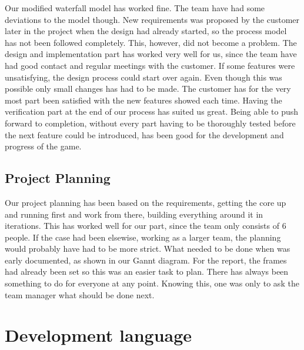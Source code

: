 Our modified waterfall model has worked fine. The team have had some deviations to the model though. New requirements was
proposed by the customer later in the project when the design had already started, so the process model has not been followed
completely. This, however, did not become a problem. The design and implementation part has worked very well for us, since the 
team have had good contact and regular meetings with the customer. If some features were unsatisfying, the design process could 
start over again. Even though this was possible only small changes has had to be made. The customer has for the very most part 
been satisfied with the new features showed each time. Having the verification part at the end of our process has suited us 
great. Being able to push forward to completion, without every part having to be thoroughly tested before the next feature 
could be introduced, has been good for the development and progress of the game. 
\subsection{Project Planning}

Our project planning has been based on the requirements, getting the core up and running first and work from there, building 
everything around it in iterations. This has worked well for our part, since the team only consists of 6 people. If the case 
had been elsewise, working as a larger team, the planning would probably have had to be more strict. What needed to be done 
when was early documented, as shown in our Gannt diagram. For the report, the frames had already been set so this was an easier 
task to plan. There has always been something to do for everyone at any point. Knowing this, one was only to ask the team manager what should be done next.


\section{Development language}

